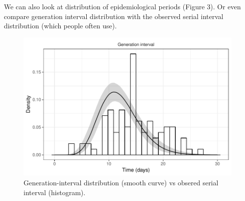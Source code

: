 \documentclass[12pt]{article}
\begin{document}
We can also look at distribution of epidemiological periods (Figure 3).
Or even compare generation interval distribution with the observed serial interval distribution (which people often use).

\begin{figure}
\includegraphics[width=\textwidth]{../figure/generation.pdf}
\caption{Generation-interval distribution (smooth curve) vs obsered serial interval (histogram).}
\end{figure}
\end{document}
